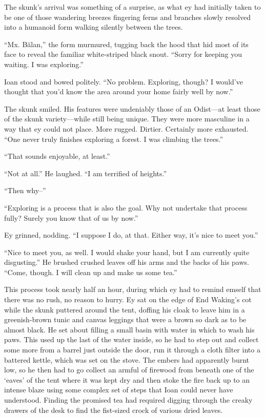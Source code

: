 The skunk's arrival was something of a surprise, as what ey had initially taken to be one of those wandering breezes fingering ferns and branches slowly resolved into a humanoid form walking silently between the trees.

``Mx. Bălan,'' the form murmured, tugging back the hood that hid most of its face to reveal the familiar white-striped black snout. ``Sorry for keeping you waiting. I was exploring.''

Ioan stood and bowed politely. ``No problem. Exploring, though? I would've thought that you'd know the area around your home fairly well by now.''

The skunk smiled. His features were undeniably those of an Odist---at least those of the skunk variety---while still being unique. They were more masculine in a way that ey could not place. More rugged. Dirtier. Certainly more exhausted. ``One never truly finishes exploring a forest. I was climbing the trees.''

``That sounds enjoyable, at least.''

``Not at all.'' He laughed. ``I am terrified of heights.''

``Then why--''

``Exploring is a process that is also the goal. Why not undertake that process fully? Surely you know that of us by now.''

Ey grinned, nodding. ``I suppose I do, at that. Either way, it's nice to meet you.''

``Nice to meet you, as well. I would shake your hand, but I am currently quite disgusting.'' He brushed crushed leaves off his arms and the backs of his paws. ``Come, though. I will clean up and make us some tea.''

This process took nearly half an hour, during which ey had to remind emself that there was no rush, no reason to hurry. Ey sat on the edge of End Waking's cot while the skunk puttered around the tent, doffing his cloak to leave him in a greenish-brown tunic and canvas leggings that were a brown so dark as to be almost black. He set about filling a small basin with water in which to wash his paws. This used up the last of the water inside, so he had to step out and collect some more from a barrel just outside the door, run it through a cloth filter into a battered kettle, which was set on the stove. The embers had apparently burnt low, so he then had to go collect an armful of firewood from beneath one of the `eaves' of the tent where it was kept dry and then stoke the fire back up to an intense blaze using some complex set of steps that Ioan could never have understood. Finding the promised tea had required digging through the creaky drawers of the desk to find the fist-sized crock of various dried leaves.

